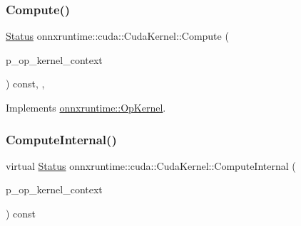 \mbox{\label{classonnxruntime_1_1cuda_1_1CudaKernel_ad0c6a6779d1fa5cc12c7437b01051405}} 
\subsubsection{\texorpdfstring{Compute()}{Compute()}}
{\footnotesize\ttfamily \mbox{\hyperlink{classonnxruntime_1_1common_1_1Status}{Status}} onnxruntime\+::cuda\+::\+Cuda\+Kernel\+::\+Compute (\begin{DoxyParamCaption}\item[{\mbox{\hyperlink{classonnxruntime_1_1OpKernelContext}{Op\+Kernel\+Context}} $\ast$}]{p\+\_\+op\+\_\+kernel\+\_\+context }\end{DoxyParamCaption}) const\hspace{0.3cm}{\ttfamily [inline]}, {\ttfamily [override]}, {\ttfamily [virtual]}}



Implements \mbox{\hyperlink{classonnxruntime_1_1OpKernel_a9eca8656a78b1b3ab9d3351a12798650}{onnxruntime\+::\+Op\+Kernel}}.

\mbox{\label{classonnxruntime_1_1cuda_1_1CudaKernel_aca7af04ae448017d6023d30bba231ebb}} 
\subsubsection{\texorpdfstring{Compute\+Internal()}{ComputeInternal()}}
{\footnotesize\ttfamily virtual \mbox{\hyperlink{classonnxruntime_1_1common_1_1Status}{Status}} onnxruntime\+::cuda\+::\+Cuda\+Kernel\+::\+Compute\+Internal (\begin{DoxyParamCaption}\item[{\mbox{\hyperlink{classonnxruntime_1_1OpKernelContext}{Op\+Kernel\+Context}} $\ast$}]{p\+\_\+op\+\_\+kernel\+\_\+context }\end{DoxyParamCaption}) const\hspace{0.3cm}{\ttfamily [pure virtual]}}



